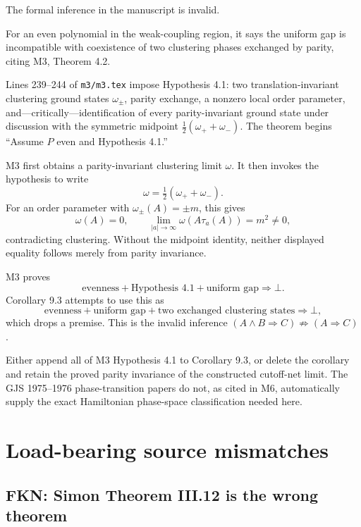 \documentclass[10pt,a4paper]{article}
\begin{document}
The formal inference in the manuscript is invalid.


For an even polynomial in the weak-coupling region, it says the uniform gap is
incompatible with coexistence of two clustering phases exchanged by parity, citing
M3, Theorem 4.2.


Lines 239--244 of \texttt{m3/m3.tex} impose Hypothesis 4.1: two translation-invariant
clustering ground states $\omega_\pm$, parity exchange, a nonzero local order parameter,
and---critically---identification of every parity-invariant ground state under discussion
with the symmetric midpoint $\tfrac12(\omega_++\omega_-)$.  The theorem begins
``Assume $P$ even and Hypothesis 4.1.''


M3 first obtains a parity-invariant clustering limit $\omega$.  It then invokes the
hypothesis to write
\[
 \omega=\tfrac12(\omega_++\omega_-).
\]
For an order parameter with $\omega_\pm(A)=\pm m$, this gives
\[
 \omega(A)=0,
 \qquad
 \lim_{|a|\to\infty}\omega(A\tau_a(A))=m^2\ne0,
\]
contradicting clustering.  Without the midpoint identity, neither displayed equality
follows merely from parity invariance.


M3 proves
\[
 \text{evenness}+\text{Hypothesis 4.1}+\text{uniform gap}
 \Longrightarrow\bot.
\]
Corollary 9.3 attempts to use this as
\[
 \text{evenness}+\text{uniform gap}+\text{two exchanged clustering states}
 \Longrightarrow\bot,
\]
which drops a premise.  This is the invalid inference
$(A\wedge B\Rightarrow C)\not\Rightarrow(A\Rightarrow C)$.


Either append all of M3 Hypothesis 4.1 to Corollary 9.3, or delete the corollary and
retain the proved parity invariance of the constructed cutoff-net limit.  The GJS
1975--1976 phase-transition papers do not, as cited in M6, automatically supply the exact
Hamiltonian phase-space classification needed here.

\section{Load-bearing source mismatches}

\subsection{FKN: Simon Theorem III.12 is the wrong theorem}
\end{document}
